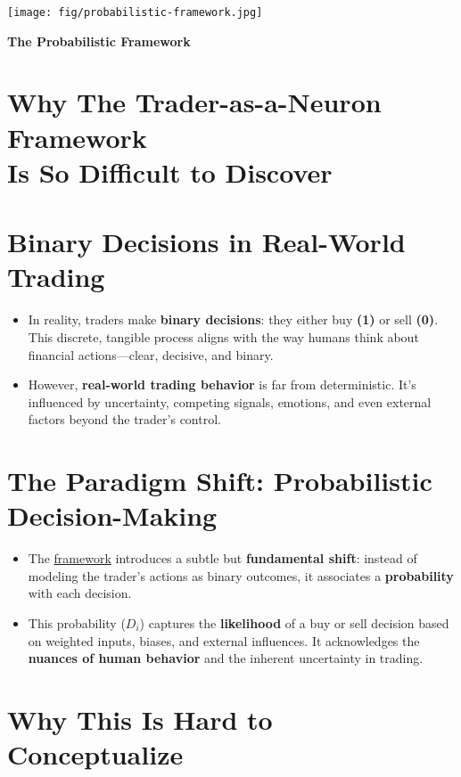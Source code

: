 \documentclass[a4]{article}
\newcommand{\bn}{\bigskip\noindent}
\begin{document}
\begin{center}
\texttt{[image: fig/probabilistic-framework.jpg]}
\end{center}

\bn
{\huge\bf The Probabilistic Framework}


\section*{Why The Trader-as-a-Neuron Framework\\ Is So Difficult to Discover}

\section{Binary Decisions in Real-World Trading}

\begin{itemize}
\item  In reality, traders make {\bf binary decisions}: they either buy {\bf (1)}  or sell {\bf (0)}. This discrete, tangible process aligns with the way humans think about financial actions---clear, decisive, and binary.
\item  However, {\bf real-world trading behavior}  is far from deterministic. It's influenced by uncertainty, competing signals, emotions, and even external factors beyond the trader's control.
\end{itemize}

\section{The Paradigm Shift: Probabilistic\\ Decision-Making}

\begin{itemize}
\item  The \href{ https://blog.quantiota.ai/page/9/the-governing-equation-of-financial-markets-a-unified-framework/}{framework}
 introduces a subtle but {\bf fundamental shift}: instead of modeling the trader's actions as binary outcomes, it associates a {\bf probability}  with each decision.
\item  This probability ($D_i$) captures the {\bf likelihood}  of a buy or sell decision based on weighted inputs, biases, and external influences. It acknowledges the {\bf nuances of human behavior}  and the inherent uncertainty in trading.
\end{itemize}

\section{Why This Is Hard to Conceptualize}
\end{document}
